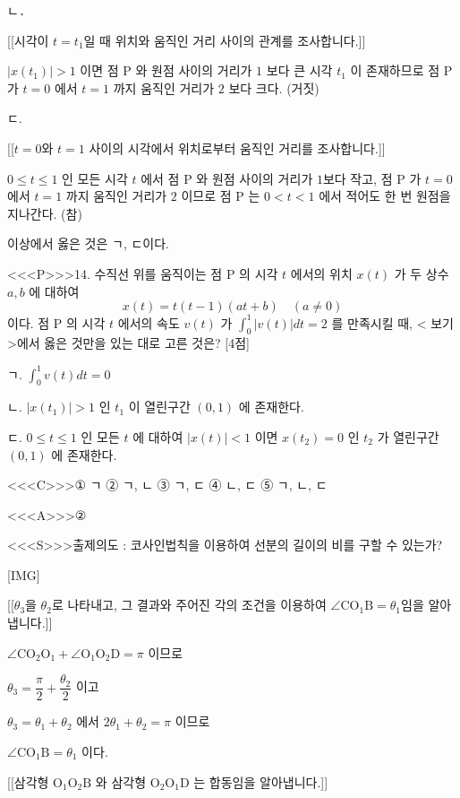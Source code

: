 \documentclass{oblivoir}
\begin{document}
ㄴ․

[[시각이 $t=t_{1}$일 때 위치와 움직인 거리 사이의 관계를 조사합니다.]]

$\left|x\left(t_{1}\right)\right|>1$ 이면 점 $\mathrm{P}$ 와 원점 사이의 거리가 $1$ 보다 큰 시각 $t_{1}$ 이 존재하므로 점 $\mathrm{P}$ 가 $t=0$ 에서 $t=1$ 까지 움직인 거리가 $2$ 보다 크다. (거짓)

ㄷ.

[[$t=0$와 $t=1$ 사이의 시각에서 위치로부터 움직인 거리를 조사합니다.]]

$0 \leq t \leq 1$ 인 모든 시각 $t$ 에서 점 $\mathrm{P}$ 와 원점 사이의 거리가 $1$보다 작고, 점 $\mathrm{P}$ 가 $t=0$ 에서 $t=1$ 까지 움직인 거리가 $2$ 이므로 점 $\mathrm{P}$ 는 $0< t< 1$ 에서 적어도 한 번 원점을 지나간다. (참)

이상에서 옳은 것은 ㄱ, ㄷ이다.


<<<P>>>14. 수직선 위를 움직이는 점 $\mathrm{P}$ 의 시각 $t$ 에서의 위치 $x(t)$ 가 두 상수 $a, b$ 에 대하여
$$
x(t)=t(t-1)(a t+b) \quad(a \neq 0)
$$
이다. 점 $\mathrm{P}$ 의 시각 $t$ 에서의 속도 $v(t)$ 가 $\displaystyle\int_{0}^{1}|v(t)| d t=2$ 를 만족시킬 때, < 보기>에서 옳은 것만을 있는 대로 고른 것은?
[4점]

ㄱ. $\displaystyle\int_{0}^{1} v(t) d t=0$

ㄴ. $\left|x\left(t_{1}\right)\right|>1$ 인 $t_{1}$ 이 열린구간 $(0,1)$ 에 존재한다.

ㄷ. $0 \leq t \leq 1$ 인 모든 $t$ 에 대하여 $|x(t)|< 1$ 이면 $x\left(t_{2}\right)=0$ 인 $t_{2}$ 가 열린구간 $(0,1)$ 에 존재한다.

<<<C>>>① ㄱ
② ㄱ, ㄴ
③ ㄱ, ㄷ
④ ㄴ, ㄷ
⑤ ㄱ, ㄴ, ㄷ

<<<A>>>②

<<<S>>>출제의도 : 코사인법칙을 이용하여 선분의 길이의 비를 구할 수 있는가?

[IMG]

[[$\theta_{3}$을 $\theta_{2}$로 나타내고, 그 결과와 주어진 각의 조건을 이용하여 $\angle \mathrm{CO_{1}B}=\theta_{1}$임을 알아냅니다.]]

$\angle \mathrm{CO_{2}O_{1}}+\angle \mathrm{O_{1} O_{2} D}=\pi$ 이므로

$\theta_{3}=\dfrac{\pi}{2}+\dfrac{\theta_{2}}{2}$ 이고

$\theta_{3}=\theta_{1}+\theta_{2}$ 에서 $2 \theta_{1}+\theta_{2}=\pi$ 이므로

$\angle \mathrm{CO_{1}B}=\theta_{1}$ 이다.

[[삼각형 $\mathrm{O_{1} O_{2} B}$ 와 삼각형 $\mathrm{O_{2} O_{1} D}$ 는 합동임을 알아냅니다.]]
\end{document}
